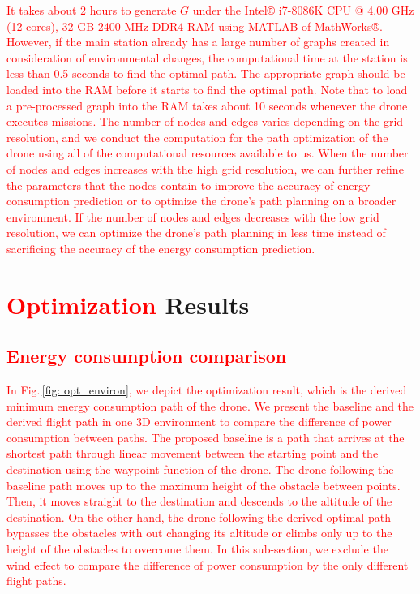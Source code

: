 \documentclass[journal]{./template/IEEEtran}
\begin{document}
\textcolor{red}{
It takes about 2 hours to generate $G$ under the Intel® i7-8086K CPU @ 4.00 GHz (12 cores), 32 GB 2400 MHz DDR4 RAM using MATLAB of MathWorks®. 
However, if the main station already has a large number of graphs created in consideration of environmental changes, the computational time at the station is less than 0.5 seconds to find the optimal path. The appropriate graph should be loaded into the RAM before it starts to find the optimal path. Note that to load a pre-processed graph into the RAM takes about 10 seconds whenever the drone executes missions. 
The number of nodes and edges varies depending on the grid resolution, and we conduct the computation for the path optimization of the drone using all of the computational resources available to us. When the number of nodes and edges increases with the high grid resolution, we can further refine the parameters that the nodes contain to improve the accuracy of energy consumption prediction or to optimize the drone’s path planning on a broader environment.
If the number of nodes and edges decreases with the low grid resolution, we can optimize the drone’s path planning in less time instead of sacrificing the accuracy of the energy consumption prediction.}














\section{\textcolor{red}{Optimization} Results}
\label{Section: results}

\subsection{\textcolor{red}{Energy consumption comparison}}

\textcolor{red}{In Fig.\,\ref{fig: opt_environ}, we depict the optimization result, which is the derived minimum energy consumption path of the drone.
We present the baseline and the derived flight path in one 3D environment to compare the difference of power consumption between paths.
The proposed baseline is a path that arrives at the shortest path through linear movement between the starting point and the destination using the waypoint function of the drone. 
The drone following the baseline path moves up to the maximum height of the obstacle between points. Then, it moves straight to the destination and descends to the altitude of the destination.
On the other hand, the drone following the derived optimal path bypasses the obstacles with out changing its altitude or climbs only up to the height of the obstacles to overcome them. 
In this sub-section, we exclude the wind effect to compare the difference of power consumption by the only different flight paths.}
\end{document}
